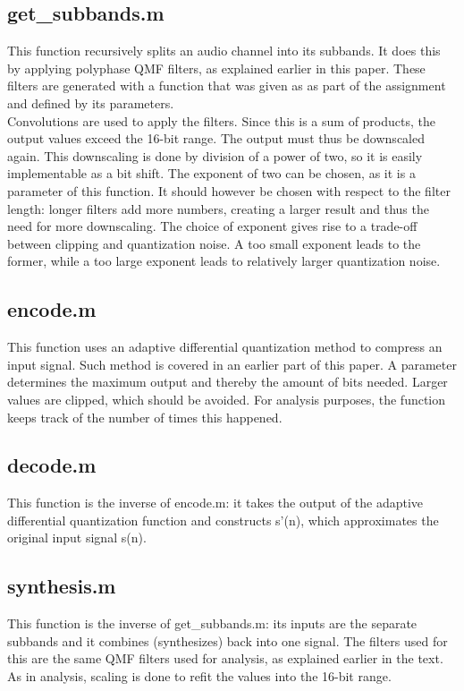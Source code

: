 \documentclass[a4paper]{article}
\begin{document}
\subsection{get\_subbands.m}
This function recursively splits an audio channel into its subbands. It does this by applying polyphase QMF filters, as explained earlier in this paper. These filters are generated with a function that was given as as part of the assignment and defined by its parameters.\\
Convolutions are used to apply the filters. Since this is a sum of products, the output values exceed the 16-bit range. The output must thus be downscaled again. This downscaling is done by division of a power of two, so it is easily implementable as a bit shift. The exponent of two can be chosen, as it is a parameter of this function. It should however be chosen with respect to the filter length: longer filters add more numbers, creating a larger result and thus the need for more downscaling. The choice of exponent gives rise to a trade-off between clipping and quantization noise. A too small exponent leads to the former, while a too large exponent leads to relatively larger quantization noise.

\subsection{encode.m}
This function uses an adaptive differential quantization method to compress an input signal. Such method is covered in an earlier part of this paper. A parameter determines the maximum output and thereby the amount of bits needed. Larger values are clipped, which should be avoided. For analysis purposes, the function keeps track of the number of times this happened.

\subsection{decode.m}
This function is the inverse of encode.m: it takes the output of the adaptive differential quantization function and constructs s'(n), which approximates the original input signal s(n).

\subsection{synthesis.m}
This function is the inverse of get\_subbands.m: its inputs are the separate subbands and it combines (synthesizes) back into one signal. The filters used for this are the same QMF filters used for analysis, as explained earlier in the text. As in analysis, scaling is done to refit the values into the 16-bit range.
\end{document}
